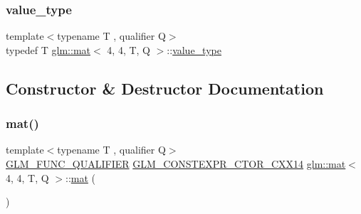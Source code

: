 \mbox{\label{structglm_1_1mat_3_014_00_014_00_01_t_00_01_q_01_4_ae564877d4d3802415244ba1c83cc4c89}} 
\subsubsection{\texorpdfstring{value\+\_\+type}{value\_type}}
{\footnotesize\ttfamily template$<$typename T , qualifier Q$>$ \\
typedef T \hyperlink{structglm_1_1mat}{glm\+::mat}$<$ 4, 4, T, Q $>$\+::\hyperlink{structglm_1_1mat_3_014_00_014_00_01_t_00_01_q_01_4_ae564877d4d3802415244ba1c83cc4c89}{value\+\_\+type}}



\subsection{Constructor \& Destructor Documentation}
\mbox{\label{structglm_1_1mat_3_014_00_014_00_01_t_00_01_q_01_4_ad5a56ae437785b4a19e5423d00e34f80}} 
\subsubsection{\texorpdfstring{mat()}{mat()}\hspace{0.1cm}{\footnotesize\ttfamily [1/21]}}
{\footnotesize\ttfamily template$<$typename T , qualifier Q$>$ \\
\hyperlink{setup_8hpp_a33fdea6f91c5f834105f7415e2a64407}{G\+L\+M\+\_\+\+F\+U\+N\+C\+\_\+\+Q\+U\+A\+L\+I\+F\+I\+ER} \hyperlink{setup_8hpp_a0900f9145e68bf6061b6f5e7be3fa751}{G\+L\+M\+\_\+\+C\+O\+N\+S\+T\+E\+X\+P\+R\+\_\+\+C\+T\+O\+R\+\_\+\+C\+X\+X14} \hyperlink{structglm_1_1mat}{glm\+::mat}$<$ 4, 4, T, Q $>$\+::\hyperlink{structglm_1_1mat}{mat} (\begin{DoxyParamCaption}{ }\end{DoxyParamCaption})}

\mbox{\label{structglm_1_1mat_3_014_00_014_00_01_t_00_01_q_01_4_a3df7423fcb4eb04f5ad5e24ce5a8d7ca}} 
